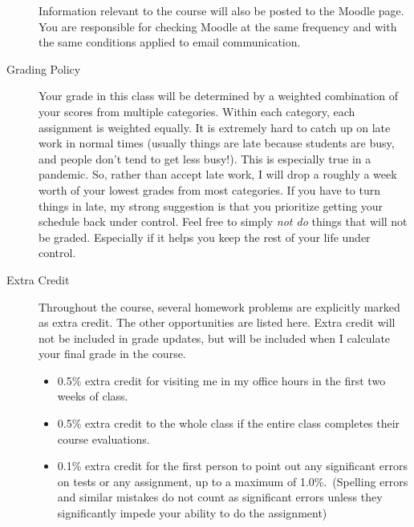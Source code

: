 \documentclass[12pt]{article}
\begin{document}
\begin{description}
  Information relevant to the course will also be posted to the Moodle page. You are responsible for checking Moodle at the same frequency and with the same conditions applied to email communication.
\pagebreak
\item[Grading Policy]
  Your grade in this class will be determined by a weighted combination of your scores from multiple categories. Within each category, each assignment is weighted equally. It is extremely hard to catch up on late work in normal times (usually things are late because students are busy, and people don't tend to get less busy!). This is especially true in a pandemic. So, rather than accept late work, I will drop a roughly a week worth of your lowest grades from most categories. If you have to turn things in late, my strong suggestion is that you prioritize getting your schedule back under control. Feel free to simply \textit{not do} things that will not be graded. Especially if it helps you keep the rest of your life under control.

\item[Extra Credit]
  Throughout the course, several homework problems are explicitly marked as extra credit. The other opportunities are listed here. Extra credit will not be included in grade updates, but will be included when I calculate your final grade in the course.
  \begin{itemize}
  \item 0.5\% extra credit for visiting me in my office hours in the first two weeks of class.
  \item 0.5\% extra credit to the whole class if the entire class completes their course evaluations.
  \item 0.1\% extra credit for the first person to point out any significant errors on tests or any assignment, up to a maximum of 1.0\%.\ (Spelling errors and similar mistakes do not count as significant errors unless they significantly impede your ability to do the assignment) 
    \end{itemize}


  


\end{description}
\end{document}
